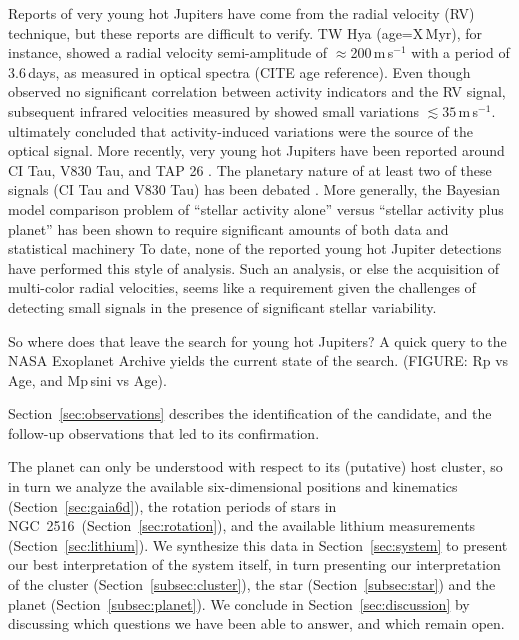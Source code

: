 \documentclass[12pt,twocolumn,tighten]{aastex63}
\newcommand{\cn}{NGC~2516} %
\begin{document}
Reports of very young hot Jupiters have come from the radial velocity
(RV) technique, but these reports are difficult to verify.  TW Hya
(age=X\,Myr), for instance, showed a radial velocity semi-amplitude of
$\approx$200\,m\,s$^{-1}$ with a period of 3.6\,days, as measured in
optical spectra \citep{setiawan_young_2008} (CITE age reference).
Even though \citet{setiawan_young_2008} observed no significant
correlation between activity indicators and the RV signal, subsequent
infrared velocities measured by \citet{huelamo_tw_2008} showed small
variations $\lesssim 35\,$m\,s$^{-1}$.  \citet{huelamo_tw_2008}
ultimately concluded that activity-induced variations were the source
of the optical signal.  More recently, very young hot Jupiters have
been reported around CI Tau, V830 Tau, and TAP 26
\citep{johns-krull_CI_Tau_candidate_2016,donati_hot_2016,donati_hot_2017,yu_hot_2017,biddle_k2_2018,flagg_co_2019}.
The planetary nature of at least two of these signals (CI Tau and V830
Tau) has been debated \citep{donati_magnetic_2020,damasso_gaps_2020}.
More generally, the Bayesian model comparison problem of ``stellar
activity alone'' versus ``stellar activity plus planet'' has been
shown to require significant amounts of both data and statistical
machinery \citep[{\it
e.g.},][]{barragan_radial_2019,klein_simulated_2020} To date, none of
the reported young hot Jupiter detections have performed this style of
analysis.  Such an analysis, or else the acquisition of multi-color
radial velocities, seems like a requirement given the challenges of
detecting small signals in the presence of significant stellar
variability.

So where does that leave the search for young hot Jupiters?
A quick query to the NASA Exoplanet Archive yields the current state
of the search.
(FIGURE: Rp vs Age, and Mp\,sini vs Age).



Section~\ref{sec:observations} describes the identification of the
candidate, and the follow-up observations that led to its confirmation.

The planet can only be understood with respect to its (putative)
host cluster, so in turn we analyze the
available six-dimensional positions and kinematics (Section~\ref{sec:gaia6d}),
the rotation periods of stars in \cn\ 
(Section~\ref{sec:rotation}), and the available lithium measurements
(Section~\ref{sec:lithium}).
We synthesize this data in
Section~\ref{sec:system} to present our best interpretation of the
system itself, in turn presenting our interpretation of the
cluster
(Section~\ref{subsec:cluster}), the star (Section~\ref{subsec:star})
and the planet (Section~\ref{subsec:planet}).  We conclude in
Section~\ref{sec:discussion} by discussing which questions we have
been able to answer, and which remain open.
\end{document}
